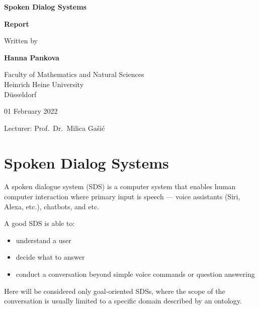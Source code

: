 \documentclass[12pt,titlepage,a4paper]{article}
\begin{document}
\begin{titlepage}
\begin{center}

\textbf{\LARGE Spoken Dialog Systems}

\bigskip\bigskip
\textbf{Report}

\bigskip\bigskip\bigskip
Written by

\bigskip
\textbf{Hanna Pankova}


\vfill
Faculty of Mathematics and Natural Sciences\\ 
Heinrich Heine University \\
D\"usseldorf

\bigskip
01 February 2022

\bigskip
Lecturer: Prof.\ Dr.\ Milica Ga\v{s}i\'{c}

\end{center}
\end{titlepage}

\thispagestyle{empty}\mbox{}
\setcounter{page}{0}

\tableofcontents

\pagebreak

\section{Spoken Dialog Systems}
A spoken dialogue system (SDS) is a computer system that enables human computer interaction where primary input is speech --- voice assistants (Siri, Alexa, etc.), chatbots, and etc. \par

A good SDS is able to:
\begin{itemize}
     \item understand a user
     \item decide what to answer
     \item conduct a conversation beyond simple voice commands or question answering
\end{itemize}

Here will be considered only goal-oriented SDSs, where the scope of the conversation is usually limited to a specific domain described by an ontology.
\end{document}

